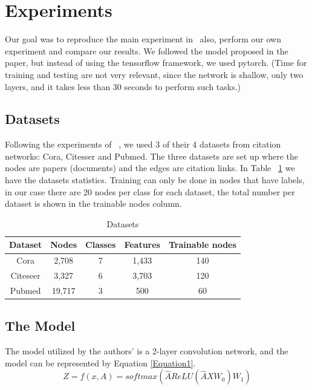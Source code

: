 \section{Experiments}
Our goal was to reproduce the main experiment in~\cite{Kipf2016} also, perform our own experiment and compare our results. We followed the model proposed in the paper, but instead of using the tensorflow framework, we used pytorch. (Time for training and testing are not very relevant, since the network is shallow, only two layers, and it takes less than 30 seconds to perform such tasks.) 

\subsection{Datasets}

Following the experiments of ~\cite{Kipf2016}, we used 3 of their 4 datasets from citation networks: Cora, Citesser and Pubmed. The three datasets are set up where the nodes are papers (documents) and the edges are citation links. In Table ~\ref{tab:datasets} we have the datasets statistics. Training can only be done in nodes that have labels, in our case there are 20 nodes per class for each dataset, the total number per dataset is shown in the trainable nodes column.

\begin {table}[ht]
  \begin{center}
    \begin{tabular}{|c|c|c|c|c|}
    \hline
    Dataset  & Nodes  & Classes & Features & Trainable nodes\\
    \hline 
    Cora     & 2,708  & 7       & 1,433    & 140 \\ 
    Citeseer & 3,327  & 6       & 3,703    & 120  \\  
    Pubmed   & 19,717 & 3       & 500      & 60   \\
    \hline
    \end{tabular}
  \end{center}
\caption {Datasets} \label{tab:datasets} 
\end{table}

\subsection{The Model}
The model utilized by the authors' is a 2-layer convolution network, and the model can be represented by Equation \ref{Equation1}.
\begin{equation}
    \label{Equation1}
    Z = f(x,A) = softmax(\hat{A}ReLU(\hat{A}XW_{0})W_{1}) 
\end{equation}

